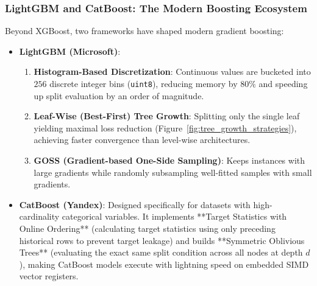 \subsubsection{LightGBM and CatBoost: The Modern Boosting Ecosystem}
Beyond XGBoost, two frameworks have shaped modern gradient boosting:
\begin{itemize}
    \item \textbf{LightGBM (Microsoft)}:
    \begin{enumerate}
        \item \textbf{Histogram-Based Discretization}: Continuous values are bucketed into $256$ discrete integer bins (\texttt{uint8}), reducing memory by $80\%$ and speeding up split evaluation by an order of magnitude.
        \item \textbf{Leaf-Wise (Best-First) Tree Growth}: Splitting only the single leaf yielding maximal loss reduction (Figure~\ref{fig:tree_growth_strategies}), achieving faster convergence than level-wise architectures.
        \item \textbf{GOSS (Gradient-based One-Side Sampling)}: Keeps instances with large gradients while randomly subsampling well-fitted samples with small gradients.
    \end{enumerate}
    \item \textbf{CatBoost (Yandex)}:
    Designed specifically for datasets with high-cardinality categorical variables. It implements **Target Statistics with Online Ordering** (calculating target statistics using only preceding historical rows to prevent target leakage) and builds **Symmetric Oblivious Trees** (evaluating the exact same split condition across all nodes at depth $d$), making CatBoost models execute with lightning speed on embedded SIMD vector registers.
\end{itemize}

